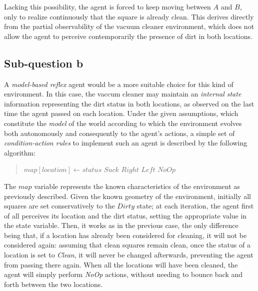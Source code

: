\documentclass[letterpaper,headings=standardclasses]{scrartcl}
\begin{document}
Lacking this possibility, the agent is forced to keep moving between $A$ and $B$, only to realize continuously that the square is already clean. This derives directly from the partial observability of the vacuum cleaner environment, which does not allow the agent to perceive contemporarily the presence of dirt in both locations.

\subsection{Sub-question b}

A \emph{model-based reflex} agent would be a more suitable choice for this kind of environment. In this case, the vaccum cleaner may maintain an \emph{internal state} information representing the dirt status in both locations, as observed on the last time the agent passed on each location. Under the given assumptions, which constitute the \emph{model} of the world according to which the environment evolves both autonomously and consequently to the agent's actions, a simple set of \emph{condition-action rules} to implement such an agent is described by the following algorithm:

\begin{quote}
\begin{algorithmic}

  \State $map[location] \gets status$
   \Return $Suck$
   \Return $Right$
   \Return $Left$
  \Else{} \Return $NoOp$
  \EndIf
\EndFunction

\end{algorithmic}
\end{quote}

The $map$ variable represents the known characteristics of the environment as previously described. Given the known geometry of the environment, initially all squares are set conservatively to the $Dirty$ state; at each iteration, the agent first of all perceives its location and the dirt status, setting the appropriate value in the state variable. Then, it works as in the previous case, the only difference being that, if a location has already been considered for cleaning, it will not be considered again: assuming that clean squares remain clean, once the status of a location is set to \emph{Clean}, it will never be changed afterwards, preventing the agent from passing there again. When all the locations will have been cleaned, the agent will simply perform \emph{NoOp} actions, without needing to bounce back and forth between the two locations.
\end{document}
